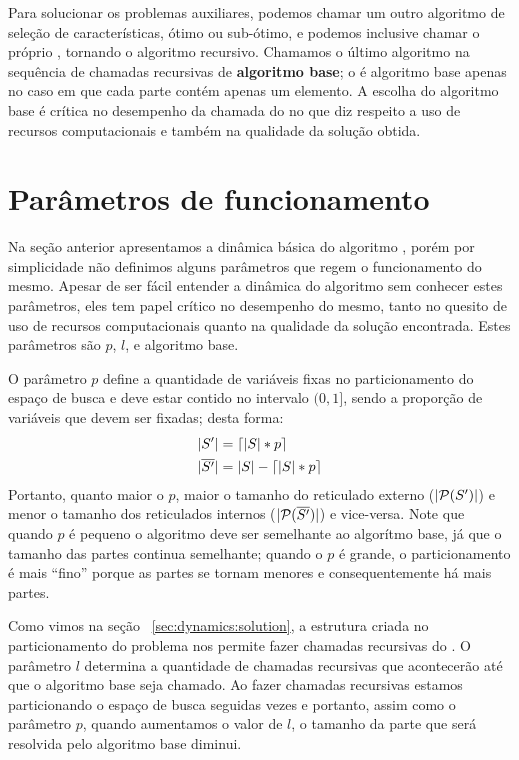 Para solucionar os problemas auxiliares, podemos chamar um outro 
algoritmo de seleção de características, ótimo ou sub-ótimo, e podemos 
inclusive chamar o próprio , tornando o algoritmo 
recursivo. Chamamos o último algoritmo na sequência de chamadas 
recursivas de {\bf algoritmo base}; o  é algoritmo base 
apenas no caso em que cada parte contém apenas um elemento. A escolha do
algoritmo base é crítica no desempenho da chamada do  
no que diz respeito a uso de recursos computacionais e também na 
qualidade da solução obtida.


\section{Parâmetros de funcionamento}
Na seção anterior apresentamos a dinâmica básica do algoritmo 
, porém por simplicidade não definimos alguns parâmetros 
que regem o funcionamento do mesmo. Apesar de ser fácil entender a 
dinâmica do algoritmo sem conhecer estes parâmetros, eles tem papel 
crítico no desempenho do mesmo, tanto no quesito de uso de recursos 
computacionais quanto na qualidade da solução encontrada. Estes 
parâmetros são $p$, $l$, e algoritmo base.

O parâmetro $p$ define a quantidade de variáveis fixas no 
particionamento do espaço de busca e deve estar contido no intervalo 
$(0, 1]$, sendo a proporção de variáveis que devem ser fixadas; desta 
forma:
\begin{align*}
    |S'| & =  \lceil |S| * p \rceil \\
    |\overline{S'}| & = |S| - \lceil |S| * p \rceil \\
\end{align*}
Portanto, quanto maior o $p$, maior o tamanho do reticulado externo 
($|\mathcal{P} (S')|$) e menor o tamanho dos reticulados internos 
($|\mathcal{P}(\overline{S'})|$) e vice-versa. Note que quando $p$ é 
pequeno o algoritmo  deve ser semelhante ao algorítmo 
base, já que o tamanho das partes continua semelhante; quando o $p$ é
grande, o particionamento é mais ``fino'' porque as partes se tornam 
menores e consequentemente há mais partes.

Como vimos na seção ~\ref{sec:dynamics:solution}, a estrutura criada no
particionamento do problema nos permite fazer chamadas recursivas do 
. O parâmetro $l$ determina a quantidade de chamadas 
recursivas que acontecerão até que o algoritmo base seja chamado. Ao 
fazer chamadas recursivas estamos particionando o espaço de busca 
seguidas vezes e portanto, assim como o parâmetro $p$, quando aumentamos 
o valor de $l$, o tamanho da parte que será resolvida pelo algoritmo 
base diminui. 

